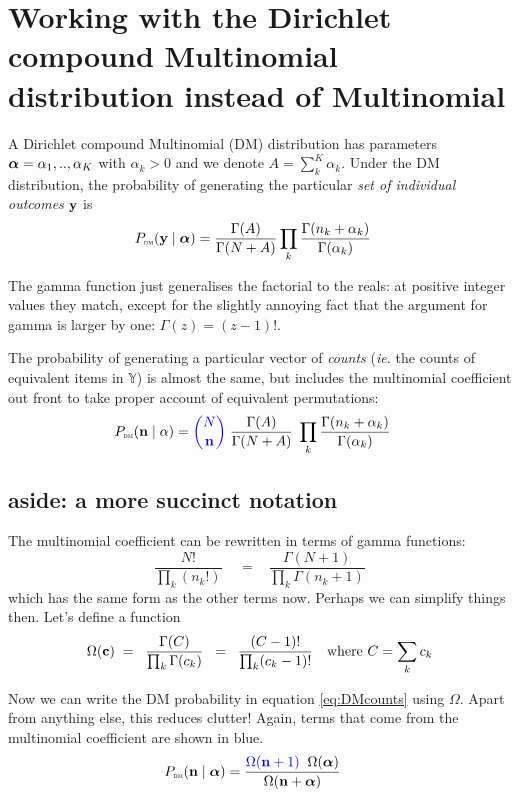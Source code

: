\documentclass[12pt]{article}
\begin{document}
\section{Working with the Dirichlet compound Multinomial distribution instead of Multinomial}
A Dirichlet compound Multinomial (DM) distribution has parameters
$\boldsymbol\alpha = \alpha_1,..,\alpha_K$ with $\alpha_k > 0$ and we denote $ A
= \sum_k^K \alpha_k$. Under the DM distribution, the probability of
generating the particular {\it set of individual outcomes}
$\mathbf{y}$ is
\begin{align}
P_\text{\tiny\sc dm}(\mathbf{y} \mid\boldsymbol\alpha) &= \frac{\Gamma(A)}{\Gamma(N+A)} \prod_k \frac{\Gamma(n_k+\alpha_k)}{\Gamma(\alpha_k)}  \label{eq:DMvalues}
\end{align}

The gamma function just generalises the factorial to the reals: at
positive integer values they match, except for the slightly annoying
fact that the argument for gamma is larger by one: $\Gamma(z) =
(z-1)!$.

The probability of generating a particular vector of {\it counts}
({\it ie.} the counts of equivalent items in $\mathbb{Y}$) is almost
the same, but includes the multinomial coefficient out front to take
proper account of equivalent permutations:
\begin{align}
P_\text{\tiny\sc dm}(\mathbf{n} \mid\alpha) &= {\color{blue} {N \choose \ensuremath{\mathbf{n}}}} \;
 \frac{\Gamma(A)}{\Gamma(N+A)} \;\prod_k \frac{\Gamma(n_k+\alpha_k)}{\Gamma(\alpha_k)}  \label{eq:DMcounts}
\end{align}

\subsection{aside: a more succinct notation}

The multinomial coefficient can be rewritten in terms of gamma functions:
\[
\frac{N!}{\prod_k (n_k!)} \;
\;\;\; = \;\;\; 
\frac{\Gamma(N+1)}{\prod_k \Gamma(n_k+1)}
\]
which has the same form as the other terms now.
Perhaps we can simplify things then. Let's define a function
\begin{align}
  \label{eq:omega}
 \Omega(\mathbf{c}) \;&= \;\;\frac{\Gamma(C)}{\prod_k \Gamma(c_k)} \;\;=\;\; \frac{(C-1)!}{\prod_k (c_k-1)! } & \text{where $C=\sum_k c_k$}
\end{align}

Now we can write the DM probability in equation \ref{eq:DMcounts}
using $\Omega$. Apart from anything else, this reduces clutter!
Again, terms that come from the multinomial coefficient are shown in
{\color{blue}blue}.
\begin{align}
P_\text{\tiny\sc dm}(\mathbf{n} \mid\boldsymbol\alpha) &= 
\frac{{\color{blue}\Omega(\mathbf{n}+1)} \;\; \Omega(\boldsymbol\alpha)}{ \Omega(\mathbf{n} + \boldsymbol\alpha)}
\label{eq:DMcounts_inOmega}
\end{align}
\end{document}
